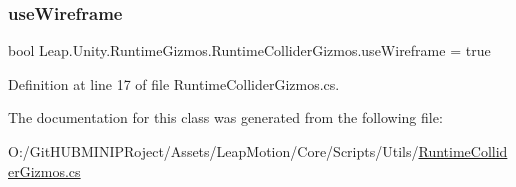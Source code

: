 \subsubsection{\texorpdfstring{useWireframe}{useWireframe}}
{\footnotesize\ttfamily bool Leap.\+Unity.\+Runtime\+Gizmos.\+Runtime\+Collider\+Gizmos.\+use\+Wireframe = true}



Definition at line 17 of file Runtime\+Collider\+Gizmos.\+cs.



The documentation for this class was generated from the following file\+:\begin{DoxyCompactItemize}
\item 
O\+:/\+Git\+H\+U\+B\+M\+I\+N\+I\+P\+Roject/\+Assets/\+Leap\+Motion/\+Core/\+Scripts/\+Utils/\mbox{\hyperlink{_runtime_collider_gizmos_8cs}{Runtime\+Collider\+Gizmos.\+cs}}\end{DoxyCompactItemize}
